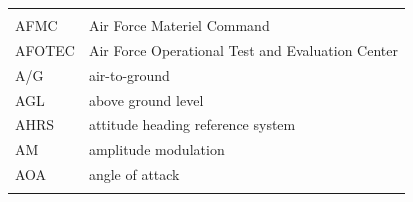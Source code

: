 \documentclass[
]{book}
\begin{document}
\begin{longtable}[]{@{}ll@{}}
\begin{minipage}[t]{0.47\columnwidth}
\end{minipage}\tabularnewline
\begin{minipage}[t]{0.47\columnwidth}\raggedright
AFMC\strut
\end{minipage} & \begin{minipage}[t]{0.47\columnwidth}\raggedright
Air Force Materiel Command\strut
\end{minipage}\tabularnewline
\begin{minipage}[t]{0.47\columnwidth}\raggedright
AFOTEC\strut
\end{minipage} & \begin{minipage}[t]{0.47\columnwidth}\raggedright
Air Force Operational Test and Evaluation Center\strut
\end{minipage}\tabularnewline
\begin{minipage}[t]{0.47\columnwidth}\raggedright
A/G\strut
\end{minipage} & \begin{minipage}[t]{0.47\columnwidth}\raggedright
air-to-ground\strut
\end{minipage}\tabularnewline
\begin{minipage}[t]{0.47\columnwidth}\raggedright
AGL\strut
\end{minipage} & \begin{minipage}[t]{0.47\columnwidth}\raggedright
above ground level\strut
\end{minipage}\tabularnewline
\begin{minipage}[t]{0.47\columnwidth}\raggedright
AHRS\strut
\end{minipage} & \begin{minipage}[t]{0.47\columnwidth}\raggedright
attitude heading reference system\strut
\end{minipage}\tabularnewline
\begin{minipage}[t]{0.47\columnwidth}\raggedright
AM\strut
\end{minipage} & \begin{minipage}[t]{0.47\columnwidth}\raggedright
amplitude modulation\strut
\end{minipage}\tabularnewline
\begin{minipage}[t]{0.47\columnwidth}\raggedright
AOA\strut
\end{minipage} & \begin{minipage}[t]{0.47\columnwidth}\raggedright
angle of attack\strut
\end{minipage}\tabularnewline
\begin{minipage}[t]{0.47\columnwidth}\raggedright

\end{minipage}
\end{longtable}
\end{document}
